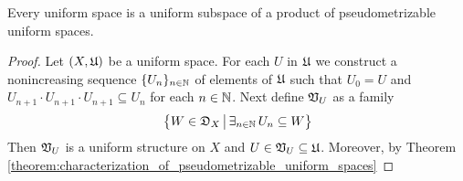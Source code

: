 \begin{corollary}\label{corollary:uniform_space_is_subspace_of_product_of_pseudometrizable_spaces}
Every uniform space is a uniform subspace of a product of pseudometrizable uniform spaces.
\end{corollary}
\begin{proof}
Let $(X,{\mathfrak U})$ be a uniform space. For each $U$ in ${\mathfrak U}$ we construct a nonincreasing sequence $\{U_n\}_{n\in {\mathbb N}}$ of elements of ${\mathfrak U}$ such that $U_0 = U$ and $U_{n+1}\cdot U_{n+1} \cdot U_{n+1} \subseteq U_n$ for each $n\in {\mathbb N}$. Next define ${\mathfrak V}_U$ as a family 
$$\big\{W \in {\mathfrak D}_X\,\big|\,\exists_{n\in {\mathbb N}}\,U_n\subseteq W\big\}$$
Then ${\mathfrak V}_U$ is a uniform structure on $X$ and $U\in {\mathfrak V}_U \subseteq {\mathfrak U}$. Moreover, by Theorem \ref{theorem:characterization_of_pseudometrizable_uniform_spaces}

\end{proof}


































